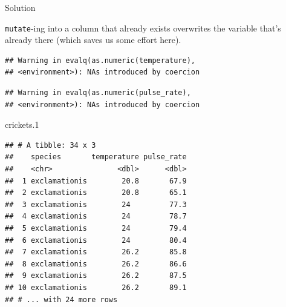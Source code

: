 \documentclass[]{tufte-book}
\newenvironment{Shaded}{}{}
\newcommand{\DataTypeTok}[1]{\textcolor[rgb]{0.56,0.13,0.00}{#1}}
\newcommand{\FloatTok}[1]{\textcolor[rgb]{0.25,0.63,0.44}{#1}}
\newcommand{\KeywordTok}[1]{\textcolor[rgb]{0.00,0.44,0.13}{\textbf{#1}}}
\newcommand{\NormalTok}[1]{#1}
\newcommand{\OperatorTok}[1]{\textcolor[rgb]{0.40,0.40,0.40}{#1}}
\newcommand{\StringTok}[1]{\textcolor[rgb]{0.25,0.44,0.63}{#1}}
\theoremstyle{definition}
\theoremstyle{definition}
\theoremstyle{definition}
\theoremstyle{remark}
\begin{document}
Solution

\texttt{mutate}-ing into a column that already exists overwrites the
variable that's already there (which saves us some effort here).

\begin{Shaded}
\end{Shaded}

\begin{verbatim}
## Warning in evalq(as.numeric(temperature),
## <environment>): NAs introduced by coercion
\end{verbatim}

\begin{verbatim}
## Warning in evalq(as.numeric(pulse_rate),
## <environment>): NAs introduced by coercion
\end{verbatim}

\begin{Shaded}
\begin{Highlighting}[]
\NormalTok{crickets}\FloatTok{.1}
\end{Highlighting}
\end{Shaded}

\begin{verbatim}
## # A tibble: 34 x 3
##    species       temperature pulse_rate
##    <chr>               <dbl>      <dbl>
##  1 exclamationis        20.8       67.9
##  2 exclamationis        20.8       65.1
##  3 exclamationis        24         77.3
##  4 exclamationis        24         78.7
##  5 exclamationis        24         79.4
##  6 exclamationis        24         80.4
##  7 exclamationis        26.2       85.8
##  8 exclamationis        26.2       86.6
##  9 exclamationis        26.2       87.5
## 10 exclamationis        26.2       89.1
## # ... with 24 more rows
\end{verbatim}
\end{document}
